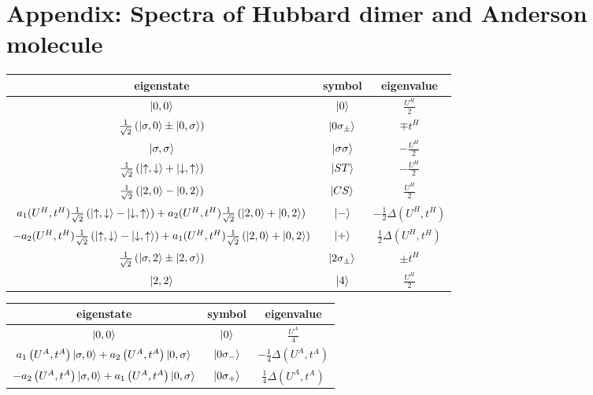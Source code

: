 \documentclass[12pt]{article}
\numberwithin{equation}{section}
\begin{document}
\newpage
\section*{Appendix: Spectra of Hubbard dimer and Anderson molecule}
\begin{center}
	\begin{tabular}{|c|c|c|}
	\hline
	eigenstate & symbol & eigenvalue \\
	\hline
	$\ket{0,0}$ & $\ket{0}$ & \( \frac{U^H}{2}\)\\
	$ \frac{1}{\sqrt 2}\left(\ket{\sigma,0} \pm \ket{0,\sigma}\right)$ & $\ket{0\sigma_\pm}$ & \(\mp t^H\)\\
	$\ket{\sigma,\sigma}$ & $\ket{\sigma\sigma}$ & \( -\frac{U^H}{2}\)\\
	$ \frac{1}{\sqrt 2}\left(\ket{\uparrow,\downarrow} + \ket{\downarrow,\uparrow}\right)$ & $\ket{ST}$ & \( -\frac{U^H}{2}\)\\
	$ \frac{1}{\sqrt 2}\left(\ket{2,0} - \ket{0,2}\right)$ & $\ket{CS}$ & \( \frac{U^H}{2}\)\\
	$a_1(U^H, t^H) \frac{1}{\sqrt 2}\left(\ket{\uparrow,\downarrow} - \ket{\downarrow,\uparrow}\right) + a_2(U^H, t^H)\frac{1}{\sqrt 2}\left(\ket{2,0} + \ket{0,2}\right)$ & $\ket{-}$ & \(-\frac{1}{2}\Delta(U^H, t^H)\)\\
	$-a_2(U^H, t^H) \frac{1}{\sqrt 2}\left(\ket{\uparrow,\downarrow} - \ket{\downarrow,\uparrow}\right) + a_1(U^H, t^H)\frac{1}{\sqrt 2}\left(\ket{2,0} + \ket{0,2}\right)$ & $\ket{+}$ & \(\frac{1}{2}\Delta(U^H, t^H)\)\\
	$ \frac{1}{\sqrt 2}\left(\ket{\sigma,2} \pm \ket{2,\sigma}\right)$ & $\ket{2\sigma_\pm}$ & \(\pm t^H\)\\
	$\ket{2,2}$ & $\ket{4}$ & \( \frac{U^H}{2}\)\\
\hline
	\end{tabular}
	\label{hubb_dim_spectrum}
	\begin{tabular}{|c|c|c|}
	\hline
	eigenstate & symbol & eigenvalue\\
	\hline
	\(\ket{0,0}\) & \(\ket{0}\) & \(\frac{U^A}{4}\)\\
	\(a_1\left(U^A, t^A\right)\ket{\sigma,0} + a_2\left(U^A, t^A\right)\ket{0, \sigma}\) & \(\ket{0\sigma_-}\) & \(-\frac{1}{4}\Delta(U^A, t^A)\)\\
	\(-a_2\left(U^A, t^A\right)\ket{\sigma,0} + a_1\left(U^A, t^A\right)\ket{0, \sigma}\) & \(\ket{0\sigma_+}\) & \(\frac{1}{4}\Delta(U^A, t^A)\)\\

\end{tabular}
\end{center}
\end{document}
